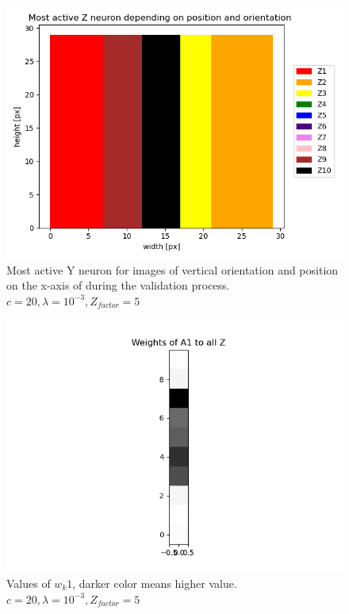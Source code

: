 \begin{figure}
  \includegraphics[width=\linewidth]{figures/horvert/horvert_c20_3_Zfactor5_verticalLines.png}
  \caption{Most active Y neuron for images of vertical orientation and position on the x-axis of during the validation process. $c = 20, \lambda = 10^{-3}, Z_{factor} = 5$}
  \label{fig:horvert_c20_3_Zfactor5_verticalLines}
\end{figure}

\begin{figure}
  \includegraphics[width=\linewidth]{figures/horvert/horvert_c20_3_Zfactor5_priorWeight1.png}
  \caption{Values of $w_k1$, darker color means higher value. $c = 20, \lambda = 10^{-3}, Z_{factor} = 5$}
  \label{fig:wkl1}
\end{figure}

